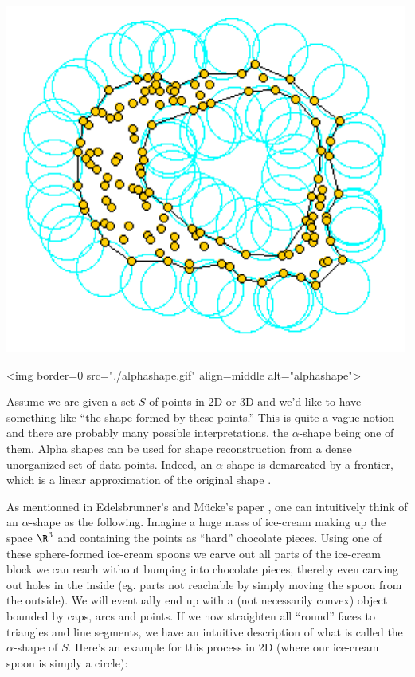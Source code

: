\begin{ccTexOnly}
\begin{center}
\includegraphics{Alpha_shapes_2/alphashape} 
\end{center}
\end{ccTexOnly}
\begin{ccHtmlOnly}
<img border=0 src="./alphashape.gif"  align=middle  alt="alphashape">
\end{ccHtmlOnly}


Assume we are given a set $S$ of points in 2D or 3D and we'd like to
have something like ``the shape formed by these points.'' This is
quite a vague notion and there are probably many possible
interpretations, the $\alpha$-shape being one of them. Alpha shapes
can be used for shape reconstruction from a dense unorganized set of
data points. Indeed, an $\alpha$-shape is demarcated by a frontier,
which is a linear approximation of the original shape \cite{bb-srmua-97t}.

As mentionned in Edelsbrunner's and M\"ucke's paper \cite{em-tdas-94},
one can intuitively think of an $\alpha$-shape as the
following. Imagine a huge mass of ice-cream making up the space $\R^3$
and containing the points as ``hard'' chocolate pieces. Using one of
these sphere-formed ice-cream spoons we carve out all parts of the
ice-cream block we can reach without bumping into chocolate pieces,
thereby even carving out holes in the inside (eg. parts not reachable
by simply moving the spoon from the outside). We will eventually end
up with a (not necessarily convex) object bounded by caps, arcs and
points. If we now straighten all ``round'' faces to triangles and line
segments, we have an intuitive description of what is called the
$\alpha$-shape of $S$. Here's an example for this process in 2D (where
our ice-cream spoon is simply a circle):
                                                                        
